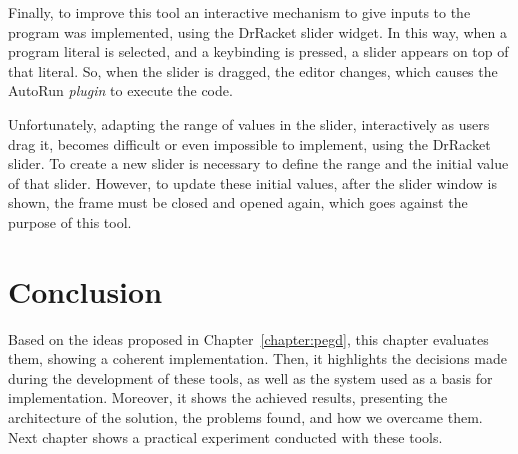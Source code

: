 Finally, to improve this tool an interactive mechanism to give inputs to the program was implemented, using the DrRacket slider widget. In this way, when a program literal is selected, and a keybinding is pressed, a slider appears on top of that literal. So, when the slider is dragged, the editor changes, which causes the AutoRun \textit{plugin} to execute the code. 

Unfortunately, adapting the range of values in the slider, interactively as users drag it, becomes difficult or even impossible to implement, using the DrRacket slider. To create a new slider is necessary to define the range and the initial value of that slider. However, to update these initial values, after the slider window is shown, the frame must be closed and opened again, which goes against the purpose of this tool.

\section{Conclusion}

Based on the ideas proposed in Chapter~\ref{chapter:pegd}, this chapter evaluates them, showing a coherent implementation. Then, it highlights the decisions made during the development of these tools, as well as the system used as a basis for implementation. Moreover, it shows the achieved results, presenting the architecture of the solution, the problems found, and how we overcame them. Next chapter shows a practical experiment conducted with these tools.